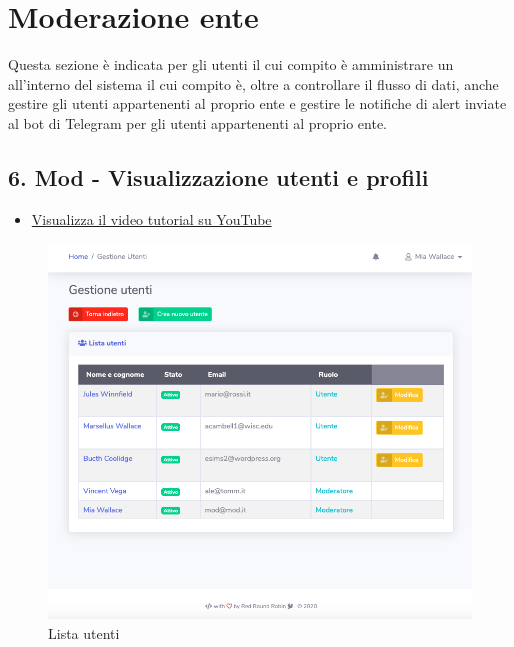 \section{Moderazione ente}
Questa sezione è indicata per gli utenti il cui compito è amministrare un  all'interno del sistema il cui compito è, oltre a controllare il flusso di dati, anche gestire gli utenti appartenenti al proprio ente e gestire le notifiche di alert inviate al bot di Telegram per gli utenti appartenenti al proprio ente.

\subsection{6. Mod - Visualizzazione utenti e profili}
	
	\begin{itemize}
		\item \href{https://www.youtube.com/watch?v=PjySMOLCtMA&list=PLPKYjnuIh1FA3b3jn_bwY_ztYzaFn2mIT&index=9}{Visualizza il video tutorial su YouTube} 
	\end{itemize}
	
	\begin{figure}[H]
		\centering
		\includegraphics[scale=0.600]{res/images/mod/listaUtenti.png}
		\caption{Lista utenti}
	\end{figure}

